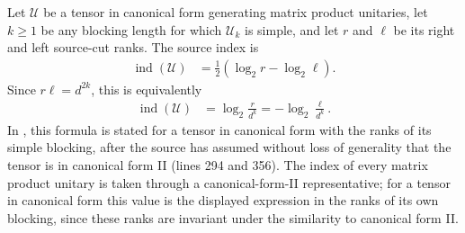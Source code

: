 \begin{definition}[Index]
    \label{def:index}
    \leanok
    Let $\mathcal U$ be a tensor in canonical form generating matrix product
    unitaries, let $k\geq1$ be any blocking length for which $\mathcal U_k$ is
    simple, and let $r$ and $\ell$ be its right and left source-cut ranks. The
    source index is
    \begin{align}
        \operatorname{ind}(\mathcal U)
         & =\frac12(\log_2 r-\log_2\ell).
    \end{align}
    Since $r\ell=d^{2k}$, this is equivalently
    \begin{align}
        \operatorname{ind}(\mathcal U)
         & =\log_2\frac{r}{d^k}
        =-\log_2\frac{\ell}{d^k}.
    \end{align}
    In \cite[Definition~IV.1]{Cirac2017MPU}, this formula is stated
    for a tensor in canonical form with the ranks of its simple blocking, after
    the source has assumed without loss of generality that the tensor is in
    canonical form II (lines 294 and 356). The index of every matrix product
    unitary is taken through a canonical-form-II representative; for a tensor in
    canonical form this value is the displayed expression in the ranks of its
    own blocking, since these ranks are invariant under the similarity to
    canonical form II.
\end{definition}


